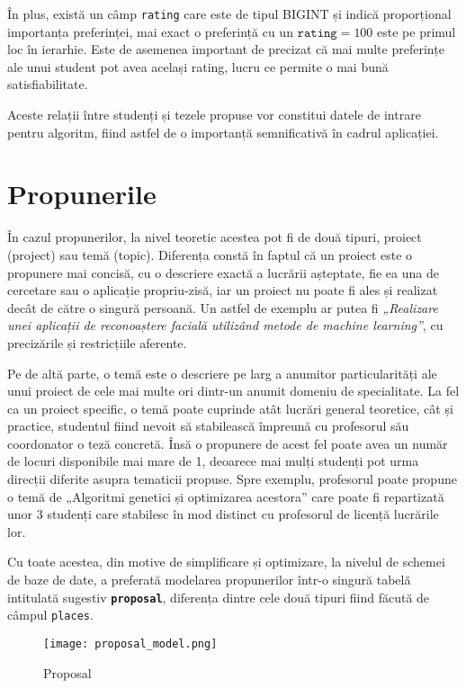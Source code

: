 În plus, există un câmp \texttt{rating} care este de tipul BIGINT și indică proporțional importanța preferinței, mai exact o preferință cu un $\texttt{rating} = 100 $ este pe primul loc în ierarhie. Este de asemenea important de precizat că mai multe preferințe ale unui student pot avea același rating, lucru ce permite o mai bună satisfiabilitate.

Aceste relații între studenți și tezele propuse vor constitui datele de intrare pentru algoritm, fiind astfel de o importanță semnificativă în cadrul aplicației.

\section{Propunerile}

În cazul propunerilor, la nivel teoretic acestea pot fi de două tipuri, proiect (project) sau temă (topic). Diferența constă în faptul că un proiect este o propunere mai concisă, cu o descriere exactă a lucrării așteptate, fie ea una de cercetare sau o aplicație propriu-zisă, iar un proiect nu poate fi ales și realizat decât de către o singură persoană.
Un astfel de exemplu ar putea fi \textit{„Realizare unei aplicații de reconoaștere facială utilizând metode de machine learning”}, cu precizările și restricțiile aferente.

Pe de altă parte, o temă este o descriere pe larg a anumitor particularități ale unui proiect de cele mai multe ori dintr-un anumit domeniu de specialitate. La fel ca un proiect specific, o temă poate cuprinde atât lucrări general teoretice, cât și practice, studentul fiind nevoit să stabilească împreună cu profesorul său coordonator o teză concretă. Însă o propunere de acest fel poate avea un număr de locuri disponibile mai mare de 1, deoarece mai mulți studenți pot urma direcții diferite asupra tematicii propuse. Spre exemplu, profesorul poate propune o temă de „Algoritmi genetici și optimizarea acestora” care poate fi repartizată unor 3 studenți care stabilesc în mod distinct cu profesorul de licență lucrările lor.

Cu toate acestea, din motive de simplificare și optimizare, la nivelul de schemei de baze de date, a preferată modelarea propunerilor într-o singură tabelă intitulată sugestiv \textbf{\texttt{proposal}}, diferența dintre cele două tipuri fiind făcută de câmpul \texttt{places}. 

\begin{figure}[H]
	\centering
	\texttt{[image: proposal\_model.png]}
	\caption{Proposal}
\end{figure}

